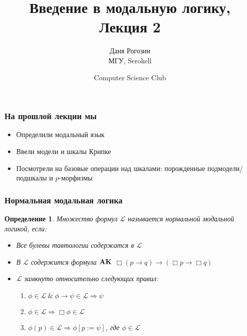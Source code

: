 \documentclass[pdf,utf8,russian,aspectratio=169]{beamer}
\title{Введение в модальную логику, \\ Лекция 2}
\author{Даня Рогозин \\ МГУ, Serokell}
\date{Computer Science Club}
\newtheorem{defin}{Определение}
\begin{document}
\maketitle

\begin{frame}
  \frametitle{На прошлой лекции мы}

  \begin{itemize}
    \item Определили модальный язык
    \item Ввели модели и шкалы Крипке
    \item Посмотрели на базовые операции над шкалами: порожденные подмодели/подшкалы и $p$-морфизмы
  \end{itemize}
\end{frame}

\begin{frame}
  \frametitle{Нормальная модальная логика}

  \begin{defin}
    Множество формул $\mathcal{L}$ называется нормальной модальной логикой, если:
    \begin{itemize}
      \item Все булевы тавтологии содержатся в $\mathcal{L}$
      \item В $\mathcal{L}$ содержится формула ${\bf A K}$ $\Box (p \to q) \to (\Box p \to \Box q)$
      \item $\mathcal{L}$ замкнуто относительно следующих правил:
        \begin{enumerate}
          \item [MP] $\phi \in \mathcal{L} \: \& \: \phi \to \psi \in \mathcal{L} \Rightarrow \psi$
          \item [Nec] $\phi \in \mathcal{L} \Rightarrow \Box \phi \in \mathcal{L}$
          \item [Sub] $\phi(p) \in \mathcal{L} \Rightarrow \phi [p := \psi]$, где $\phi \in \mathcal{L}$
        \end{enumerate}
    \end{itemize}
  \end{defin}
\end{frame}
\end{document}
